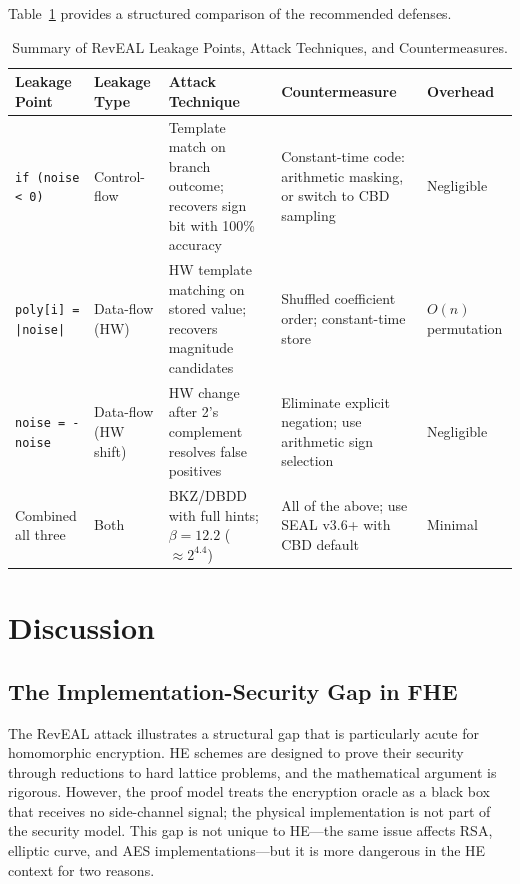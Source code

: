 \documentclass[sigconf,nonacm]{acmart}
\begin{document}
Table~\ref{tab:defenses} provides a structured comparison of the recommended defenses.

\begin{table}[t]
\caption{Summary of RevEAL Leakage Points, Attack Techniques, and Countermeasures.}
\label{tab:defenses}
\small
\begin{tabularx}{\textwidth}{@{}p{2.4cm}p{1.8cm}Xp{3.5cm}p{1.5cm}@{}}
\toprule
\textbf{Leakage Point} & \textbf{Leakage Type} & \textbf{Attack Technique} & \textbf{Countermeasure} & \textbf{Overhead} \\
\midrule
\texttt{if (noise < 0)} & Control-flow & Template match on branch outcome; recovers sign bit with 100\% accuracy & Constant-time code: arithmetic masking, or switch to CBD sampling & Negligible \\
\addlinespace[3pt]
\texttt{poly[i] = |noise|} & Data-flow (HW) & HW template matching on stored value; recovers magnitude candidates & Shuffled coefficient order; constant-time store & $O(n)$ permutation \\
\addlinespace[3pt]
\texttt{noise = -noise} & Data-flow (HW shift) & HW change after 2's complement resolves false positives & Eliminate explicit negation; use arithmetic sign selection & Negligible \\
\addlinespace[3pt]
Combined all three & Both & BKZ/DBDD with full hints; $\beta = 12.2$ ($\approx 2^{4.4}$) & All of the above; use SEAL v3.6+ with CBD default & Minimal \\
\bottomrule
\end{tabularx}
\end{table}

\section{Discussion}

\subsection{The Implementation-Security Gap in FHE}

The RevEAL attack illustrates a structural gap that is particularly acute for
homomorphic encryption. HE schemes are designed to prove their security through
reductions to hard lattice problems, and the mathematical argument is rigorous.
However, the proof model treats the encryption oracle as a black box that receives
no side-channel signal; the physical implementation is not part of the security
model. This gap is not unique to HE---the same issue affects RSA, elliptic curve,
and AES implementations---but it is more dangerous in the HE context for two reasons.
\end{document}
